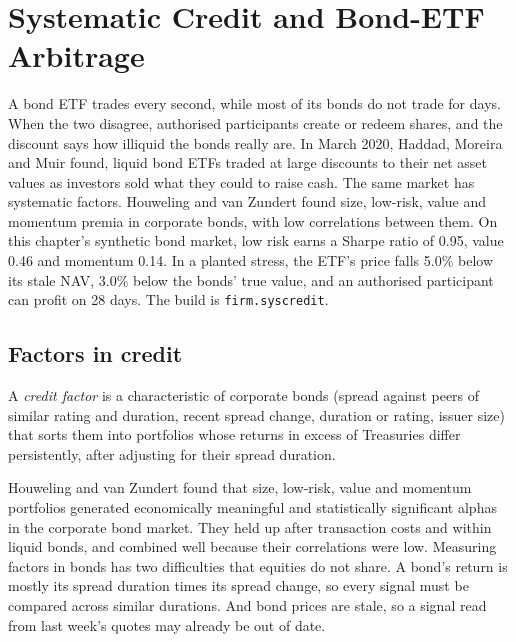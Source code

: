 \chapter{Systematic Credit and Bond-ETF Arbitrage}\label{ch:s2:systematic-credit-and-bond-etf-arbitrage}

A bond ETF trades every second, while most of its bonds do not trade for days. When the two disagree, authorised participants create or redeem shares,
and the discount says how illiquid the bonds really are. In March 2020, Haddad, Moreira and Muir found, liquid bond ETFs traded at large discounts to
their net asset values as investors sold what they could to raise cash. The same market has systematic factors. Houweling and van Zundert found size,
low-risk, value and momentum premia in corporate bonds, with low correlations between them. On this chapter's synthetic bond market, low risk earns a
Sharpe ratio of 0.95, value 0.46 and momentum 0.14. In a planted stress, the ETF's price falls 5.0\% below its stale NAV, 3.0\% below the bonds' true
value, and an authorised participant can profit on 28 days. The build is \texttt{firm.syscredit}.

\section{Factors in credit}

\begin{definition}\label{def:s2:systematic-credit-and-bond-etf-arbitrage:factor}
A \emph{credit factor} is a characteristic of corporate bonds (spread against peers of similar rating and duration, recent spread
change, duration or rating, issuer size) that sorts them into portfolios whose returns in excess of Treasuries differ persistently, after adjusting for
their spread duration.
\end{definition}

Houweling and van Zundert found that size, low-risk, value and momentum portfolios generated economically meaningful and statistically significant
alphas in the corporate bond market. They held up after transaction costs and within liquid bonds, and combined well because their correlations were
low. Measuring factors in bonds has two difficulties that equities do not share. A bond's return is mostly its spread duration times its spread
change, so every signal must be compared across similar durations. And bond prices are stale, so a signal read from last week's quotes may already be
out of date.

